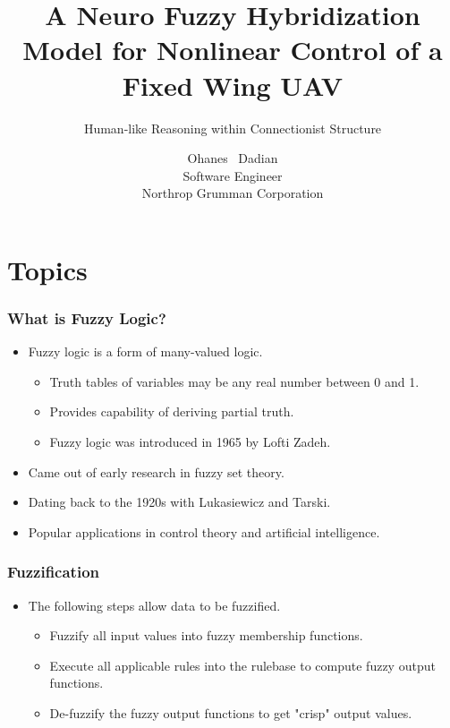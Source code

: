 \documentclass{beamer}
\title[Neuro Fuzzy Hybridization]
   {A Neuro Fuzzy Hybridization Model for Nonlinear Control of a Fixed Wing UAV}
\subtitle{Human-like Reasoning within Connectionist Structure}
\author[Dadian]
   {Ohanes ~Dadian\inst{1} \\
   {Software Engineer} \\
   {Northrop Grumman Corporation}}
\begin{document}
   \frame{\titlepage}

   \section{Topics}

   \begin{frame}
      \frametitle{What is Fuzzy Logic?}
      \begin{itemize}
         \item Fuzzy logic is a form of many-valued logic.
         \begin{itemize}
            \item Truth tables of variables may be any real number between 0 and 1.
            \item Provides capability of deriving partial truth.
            \item Fuzzy logic was introduced in 1965 by Lofti Zadeh.
         \end{itemize}
         \item Came out of early research in fuzzy set theory.
         \item Dating back to the 1920s with Lukasiewicz and Tarski.
         \item Popular applications in control theory and artificial intelligence.
      \end{itemize}
   \end{frame}

   \begin{frame}
      \frametitle{Fuzzification}
      \begin{itemize}
         \item The following steps allow data to be fuzzified.
         \begin{itemize}
            \item Fuzzify all input values into fuzzy membership functions.
            \item Execute all applicable rules into the rulebase to compute fuzzy output functions.
            \item De-fuzzify the fuzzy output functions to get "crisp" output values.
         \end{itemize}
      \end{itemize}
   \end{frame}
\end{document}

